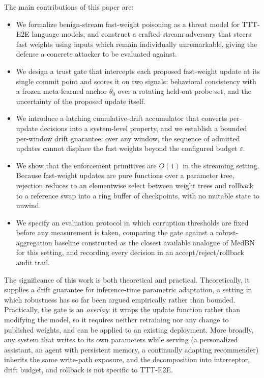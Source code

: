 \documentclass[journal]{IEEEtran}
\newcommand{\anchorp}{\theta_{0}}
\newcommand{\budget}{\varepsilon}
\begin{document}
The main contributions of this paper are:

\begin{itemize}
\item We formalize benign-stream fast-weight poisoning as a threat model for
TTT-E2E language models, and construct a crafted-stream adversary that steers fast
weights using inputs which remain individually unremarkable, giving the defense a
concrete attacker to be evaluated against.

\item We design a trust gate that intercepts each proposed fast-weight update at
its single commit point and scores it on two signals: behavioral consistency with a
frozen meta-learned anchor $\anchorp$ over a rotating held-out probe set, and the
uncertainty of the proposed update itself.

\item We introduce a latching cumulative-drift accumulator that converts per-update
decisions into a system-level property, and we establish a bounded per-window drift
guarantee: over any window, the sequence of admitted updates cannot displace the
fast weights beyond the configured budget $\budget$.

\item We show that the enforcement primitives are $O(1)$ in the streaming setting.
Because fast-weight updates are pure functions over a parameter tree, rejection
reduces to an elementwise select between weight trees and rollback to a reference
swap into a ring buffer of checkpoints, with no mutable state to unwind.

\item We specify an evaluation protocol in which corruption thresholds are fixed
before any measurement is taken, comparing the gate against a robust-aggregation
baseline constructed as the closest available analogue of MedBN for this setting,
and recording every decision in an accept/reject/rollback audit trail.
\end{itemize}

The significance of this work is both theoretical and practical. Theoretically, it
supplies a drift guarantee for inference-time parametric adaptation, a setting in
which robustness has so far been argued empirically rather than bounded.
Practically, the gate is an \emph{overlay}: it wraps the update function rather than
modifying the model, so it requires neither retraining nor any change to published
weights, and can be applied to an existing deployment. More broadly, any system that
writes to its own parameters while serving (a personalized assistant, an agent
with persistent memory, a continually adapting recommender) inherits the same
write-path exposure, and the decomposition into interceptor, drift budget, and
rollback is not specific to TTT-E2E.
\end{document}
